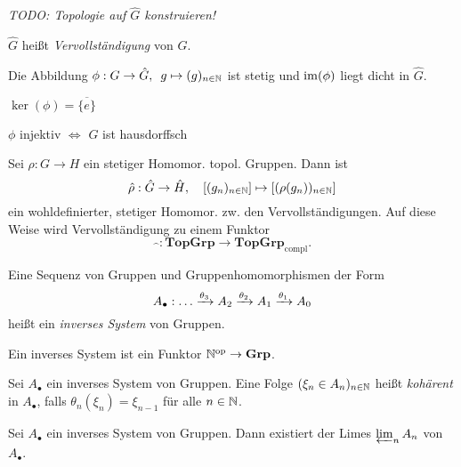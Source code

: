 \documentclass{cheat-sheet}
\newcommand{\clos}[1]{\overline{#1}} %
\newcommand{\Grp}{\mathbf{Grp}} %
\newcommand{\TopGrp}{\mathbf{TopGrp}} %
\newcommand{\ComplTopGrp}{\mathbf{TopGrp}_{\text{compl}}} %
\newcommand{\op}{\mathrm{op}} %
\begin{document}
\emph{TODO: Topologie auf $\hat{G}$ konstruieren!}

\begin{defn}
  $\hat{G}$ heißt \emph{Vervollständigung} von $G$.
\end{defn}

\begin{bem}
  Die Abbildung $\phi : G \to \hat{G}, \enspace g \mapsto (g)_{n \in \mathbb{N}}$ ist stetig und $\operatorname{im}(\phi)$ liegt dicht in $\hat{G}$.
\end{bem}

\begin{lem}
  $\ker(\phi) = \clos{\{ e \}}$
\end{lem}

\begin{kor}
  $\phi$ injektiv $\iff$ $G$ ist hausdorffsch
\end{kor}

\begin{bem}
  Sei $\rho \!:\! G \to H$ ein stetiger Homomor. topol. Gruppen.
  Dann ist
  \[
    \hat{\rho} : \hat{G} \to \hat{H}, \quad
    [(g_n)_{n \in \mathbb{N}}] \mapsto [(\rho(g_n))_{n \in \mathbb{N}}]
  \]
  ein wohldefinierter, stetiger Homomor. zw. den Vervollständigungen.
  Auf diese Weise wird Vervollständigung zu einem Funktor
  \[
    \widehat{\enspace} : \TopGrp \to \ComplTopGrp.
  \]
\end{bem}


\begin{defn}
  Eine Sequenz von Gruppen und Gruppenhomomorphismen der Form
  \[
    A_\bullet : \ldots \xrightarrow{\theta_3} A_2 \xrightarrow{\theta_2} A_1 \xrightarrow{\theta_1} A_0
  \]
  heißt ein \emph{inverses System} von Gruppen.
\end{defn}

\begin{bem}
  Ein inverses System ist ein Funktor $\N^\op \to \Grp$.
\end{bem}

\begin{defn}
  Sei $A_\bullet$ ein inverses System von Gruppen.
  Eine Folge $(\xi_n \in A_n)_{n \in \mathbb{N}}$ heißt \emph{kohärent} in $A_\bullet$, falls $\theta_n(\xi_n) = \xi_{n-1}$ für alle $n \in \mathbb{N}$.
\end{defn}

\begin{prop}
  Sei $A_\bullet$ ein inverses System von Gruppen.
  Dann existiert der Limes $\varprojlim_{n} A_n$ von $A_\bullet$.
\end{prop}
\end{document}
